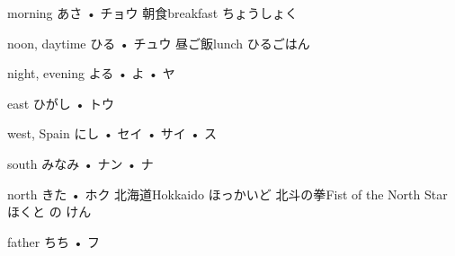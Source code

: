 



\setcounter{cardnum}{1}

		{morning}
		{あさ • チョウ}
		{朝食}{breakfast ちょうしょく}
		{}{}
		{}{}
		{}{}
		{}{}

		{noon, daytime}
		{ひる • チュウ}
		{昼ご飯}{lunch ひるごはん}
		{}{}
		{}{}
		{}{}
		{}{}

		{night, evening}
		{よる • よ • ヤ}
		{}{}
		{}{}
		{}{}
		{}{}
		{}{}

		{east}
		{ひがし • トウ}
		{}{}
		{}{}
		{}{}
		{}{}
		{}{}

		{west, Spain}
		{にし • セイ • サイ • ス}
		{}{}
		{}{}
		{}{}
		{}{}
		{}{}

		{south}
		{みなみ • ナン • ナ}
		{}{}
		{}{}
		{}{}
		{}{}
		{}{}

		{north}
		{きた • ホク}
		{北海道}{Hokkaido ほっかいど}
		{北斗の拳}{Fist of the North Star ほくと の けん}
		{}{}
		{}{}
		{}{}

		{father}
		{ちち • フ}
		{}{}
		{}{}
		{}{}
		{}{}
		{}{}

